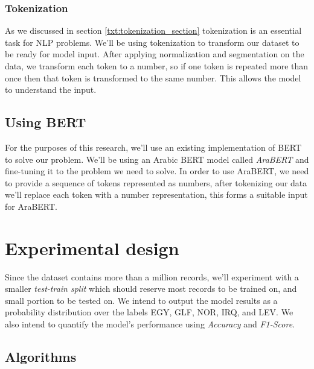 \documentclass[12pt]{diazessay}
\begin{document}
            \subsubsection{Tokenization}
            As we discussed in section \ref{txt:tokenization_section} tokenization is an essential task for NLP problems. We'll be using tokenization to transform our dataset to be ready for model input. After applying normalization and segmentation on the data, we transform each token to a number, so if one token is repeated more than once then that token is transformed to the same number. This allows the model to understand the input.
            
        \subsection{Using BERT}
        For the purposes of this research, we'll use an existing implementation of BERT to solve our problem. We'll be using an Arabic BERT model called \emph{AraBERT} and fine-tuning it to the problem we need to solve.\cite{wissam}
        In order to use AraBERT, we need to provide a sequence of tokens represented as numbers, after tokenizing our data we'll replace each token with a number representation, this forms a suitable input for AraBERT.
            
    
    \section{Experimental design}
        Since the dataset contains more than a million records, we'll experiment with a smaller \emph{test-train split} which should reserve most records to be trained on, and small portion to be tested on. We intend to output the model results as a probability distribution over the labels EGY, GLF, NOR, IRQ, and LEV. We also intend to quantify the model's performance using \emph{Accuracy} and \emph{F1-Score}.

        \subsection{Algorithms}
        
\end{document}
